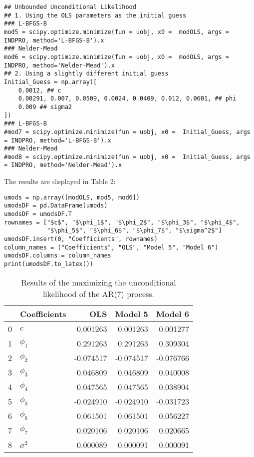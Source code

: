 \documentclass{article}
\begin{document}
\begin{verbatim}
## Unbounded Unconditional Likelihood
## 1. Using the OLS parameters as the initial guess
### L-BFGS-B
mod5 = scipy.optimize.minimize(fun = uobj, x0 =  modOLS, args = INDPRO, method='L-BFGS-B').x
### Nelder-Mead
mod6 = scipy.optimize.minimize(fun = uobj, x0 =  modOLS, args = INDPRO, method='Nelder-Mead').x
## 2. Using a slightly different initial guess
Initial_Guess = np.array([
    0.0012, ## c
    0.00291, 0.007, 0.0509, 0.0024, 0.0409, 0.012, 0.0601, ## phi
    0.009 ## sigma2 
])
### L-BFGS-B
#mod7 = scipy.optimize.minimize(fun = uobj, x0 =  Initial_Guess, args = INDPRO, method='L-BFGS-B').x
### Nelder-Mead
#mod8 = scipy.optimize.minimize(fun = uobj, x0 =  Initial_Guess, args = INDPRO, method='Nelder-Mead').x
\end{verbatim}
The results are displayed in Table 2:
\begin{verbatim}
umods = np.array([modOLS, mod5, mod6])
umodsDF = pd.DataFrame(umods)
umodsDF = umodsDF.T
rownames = ["$c$", "$\phi_1$", "$\phi_2$", "$\phi_3$", "$\phi_4$", 
            "$\phi_5$", "$\phi_6$", "$\phi_7$", "$\sigma^2$"]
umodsDF.insert(0, "Coefficients", rownames)
column_names = ("Coefficients", "OLS", "Model 5", "Model 6")
umodsDF.columns = column_names
print(umodsDF.to_latex())
\end{verbatim}

\begin{table}[h]
\centering
\begin{tabular}{llrrr}
\toprule
 & Coefficients & OLS & Model 5 & Model 6 \\
\midrule
0 & $c$ & 0.001263 & 0.001263 & 0.001277 \\
1 & $\phi_1$ & 0.291263 & 0.291263 & 0.309304 \\
2 & $\phi_2$ & -0.074517 & -0.074517 & -0.076766 \\
3 & $\phi_3$ & 0.046809 & 0.046809 & 0.040008 \\
4 & $\phi_4$ & 0.047565 & 0.047565 & 0.038904 \\
5 & $\phi_5$ & -0.024910 & -0.024910 & -0.031723 \\
6 & $\phi_6$ & 0.061501 & 0.061501 & 0.056227 \\
7 & $\phi_7$ & 0.020106 & 0.020106 & 0.020665 \\
8 & $\sigma^2$ & 0.000089 & 0.000091 & 0.000091 \\
\bottomrule
\end{tabular}
\caption{Results of the maximizing the unconditional likelihood of the AR(7) process.}
\end{table}
\end{document}
